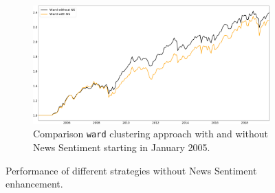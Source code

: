 \begin{figure}[H]
\medskip
\begin{subfigure}{0.8\textwidth}%
\centering
\includegraphics[width=\linewidth]{Plots_and_Tables/perf_noTC_ward_comp_F_2_B_0_LB_12_11_!!}
\caption{Comparison \texttt{ward} clustering approach with and without News Sentiment starting in January 2005.} \label{fig:comp_noNS_perf}
\end{subfigure}%


\caption{Performance of different strategies without News Sentiment enhancement.} \label{fig:noNS_perf}
\end{figure}
\newpage